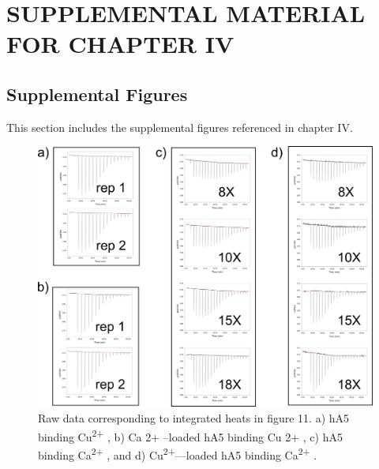 \chapter{SUPPLEMENTAL MATERIAL FOR CHAPTER IV}

\section{Supplemental Figures}
This section includes the supplemental figures referenced in chapter IV.

\begin{figure}
\centering
	\includegraphics{ch4-figS1.png} 
\caption[Raw data corresponding to integrated heats in figure 11]{Raw data corresponding to integrated heats in figure 11. a) hA5 binding Cu\textsuperscript{2+} , b) Ca 2+ –loaded hA5 binding Cu 2+ , c) hA5 binding Ca\textsuperscript{2+} , and d) Cu\textsuperscript{2+}---loaded hA5 binding
Ca\textsuperscript{2+} .\label{samplefigure}}	
\end{figure}
